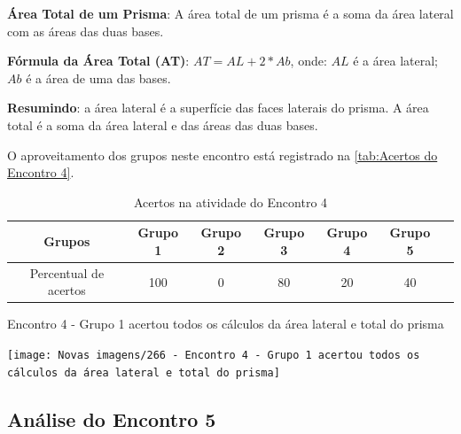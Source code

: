 \textbf{Área Total de um Prisma}: A área total de um prisma é a soma da área lateral com as áreas das duas bases.

\textbf{Fórmula da Área Total (AT)}: \textcolor[HTML]{0000FF}{$AT = AL + 2 * Ab$}, onde: $AL$ é a área lateral; $Ab$ é a área de uma das bases.

\textbf{Resumindo}: a área lateral é a superfície das faces laterais do prisma. A área total é a soma da área lateral e das áreas das duas bases.

O aproveitamento dos grupos neste encontro está registrado na \autoref{tab:Acertos do Encontro 4}.

\begin{table}[htbp] \centering
    \caption{Acertos na atividade do Encontro 4} \label{tab:Acertos do Encontro 4}
    \begin{tabular}{|c|c|c|c|c|c|c|}
        \hline
        \textbf{Grupos}       & \textbf{Grupo 1} & \textbf{Grupo 2} & \textbf{Grupo 3} & \textbf{Grupo 4} & \textbf{Grupo 5} \\
        \hline
        Percentual de acertos & 100              & 0                & 80               & 20               & 40               \\
        \hline
    \end{tabular}
    \legend{\legendaTabela}
\end{table}

\begin{CenteredFigure}
    \caption{Encontro 4 - Grupo 1 acertou todos os cálculos da área lateral e total do prisma} \label{fig: 266 - Encontro 4 - Grupo 1 acertou todos os calculos da area lateral e total do prisma}
    \texttt{[image: Novas imagens/266 - Encontro 4 - Grupo 1 acertou todos os cálculos da área lateral e total do prisma]}
    \legend{\autoria}
\end{CenteredFigure}


\subsection{Análise do Encontro 5}

